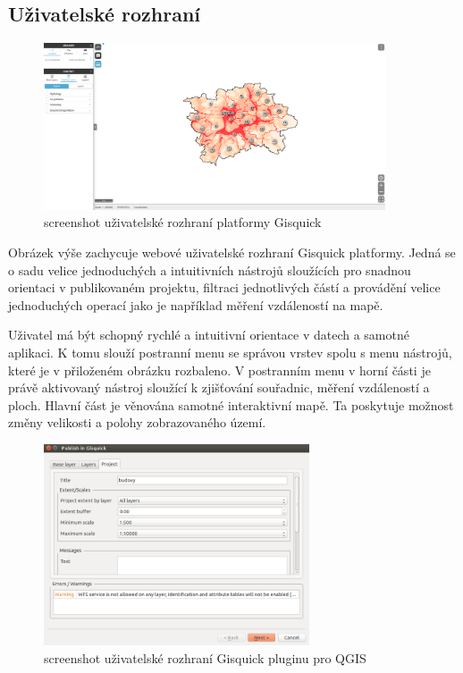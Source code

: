 \subsection{Uživatelské rozhraní}

\begin{figure}[h!]
	\centering
	\includegraphics[width=0.9\textwidth]{../img/gisquick_ui.png}
	\caption{screenshot uživatelské rozhraní platformy Gisquick\cite{gisquick-prague}}
	\label{fig:gisquick-prague}
\end{figure}

Obrázek výše zachycuje webové uživatelské rozhraní Gisquick platformy. Jedná se o sadu velice jednoduchých a intuitivních nástrojů sloužících pro snadnou orientaci v publikovaném projektu, filtraci jednotlivých částí a provádění velice jednoduchých operací jako je například měření vzdáleností na mapě.

Uživatel má být schopný rychlé a intuitivní orientace v datech a samotné aplikaci. K tomu slouží postranní menu se správou vrstev spolu s menu nástrojů, které je v přiloženém obrázku rozbaleno. V postranním menu v horní části je právě aktivovaný nástroj sloužící k zjišťování souřadnic, měření vzdáleností a ploch. Hlavní část je věnována samotné interaktivní mapě. Ta poskytuje možnost změny velikosti a polohy zobrazovaného území.

\begin{figure}[h!]
	\centering
	\includegraphics[width=0.7\textwidth]{../img/gisquick_plugin.png}
	\caption{screenshot uživatelské rozhraní Gisquick pluginu pro QGIS}
	\label{fig:gisquick-plugin}
\end{figure}

